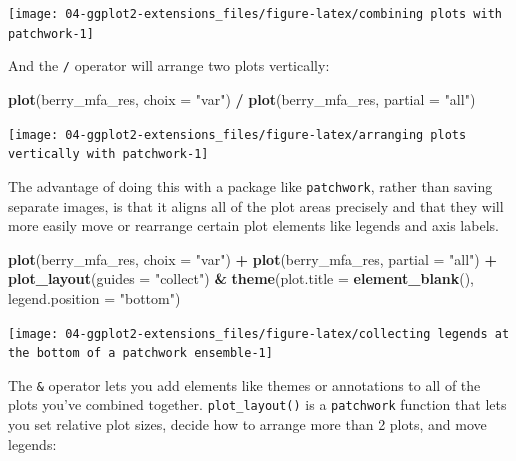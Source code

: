 \documentclass[
]{book}
\newenvironment{Shaded}{\begin{snugshade}}{\end{snugshade}}
\newcommand{\AttributeTok}[1]{\textcolor[rgb]{0.13,0.29,0.53}{#1}}
\newcommand{\FunctionTok}[1]{\textcolor[rgb]{0.13,0.29,0.53}{\textbf{#1}}}
\newcommand{\NormalTok}[1]{#1}
\newcommand{\SpecialCharTok}[1]{\textcolor[rgb]{0.81,0.36,0.00}{\textbf{#1}}}
\newcommand{\StringTok}[1]{\textcolor[rgb]{0.31,0.60,0.02}{#1}}
\begin{document}
\begin{center}\texttt{[image: 04-ggplot2-extensions\_files/figure-latex/combining plots with patchwork-1]} \end{center}

And the \texttt{/} operator will arrange two plots vertically:

\begin{Shaded}
\begin{Highlighting}[]
\FunctionTok{plot}\NormalTok{(berry\_mfa\_res, }\AttributeTok{choix =} \StringTok{"var"}\NormalTok{) }\SpecialCharTok{/} \FunctionTok{plot}\NormalTok{(berry\_mfa\_res, }\AttributeTok{partial =} \StringTok{"all"}\NormalTok{)}
\end{Highlighting}
\end{Shaded}

\begin{center}\texttt{[image: 04-ggplot2-extensions\_files/figure-latex/arranging plots vertically with patchwork-1]} \end{center}

The advantage of doing this with a package like \texttt{patchwork}, rather than saving separate images, is that it aligns all of the plot areas precisely and that they will more easily move or rearrange certain plot elements like legends and axis labels.

\begin{Shaded}
\begin{Highlighting}[]
\FunctionTok{plot}\NormalTok{(berry\_mfa\_res, }\AttributeTok{choix =} \StringTok{"var"}\NormalTok{) }\SpecialCharTok{+} \FunctionTok{plot}\NormalTok{(berry\_mfa\_res, }\AttributeTok{partial =} \StringTok{"all"}\NormalTok{) }\SpecialCharTok{+}
  \FunctionTok{plot\_layout}\NormalTok{(}\AttributeTok{guides =} \StringTok{"collect"}\NormalTok{) }\SpecialCharTok{\&}
  \FunctionTok{theme}\NormalTok{(}\AttributeTok{plot.title =} \FunctionTok{element\_blank}\NormalTok{(),}
        \AttributeTok{legend.position =} \StringTok{"bottom"}\NormalTok{)}
\end{Highlighting}
\end{Shaded}

\begin{center}\texttt{[image: 04-ggplot2-extensions\_files/figure-latex/collecting legends at the bottom of a patchwork ensemble-1]} \end{center}

The \texttt{\&} operator lets you add elements like themes or annotations to all of the plots you've combined together. \texttt{plot\_layout()} is a \texttt{patchwork} function that lets you set relative plot sizes, decide how to arrange more than 2 plots, and move legends:
\end{document}
